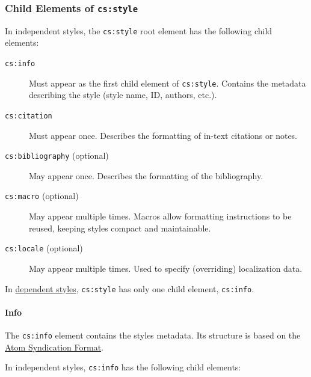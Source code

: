 \hypertarget{child-elements-of-csstyle}{%
\subsubsection{\texorpdfstring{Child Elements of
\texttt{cs:style}}{Child Elements of cs:style}}\label{child-elements-of-csstyle}}

In independent styles, the \texttt{cs:style} root element has the
following child elements:

\begin{description}
\item[\texttt{cs:info}]
Must appear as the first child element of \texttt{cs:style}. Contains
the metadata describing the style (style name, ID, authors, etc.).
\item[\texttt{cs:citation}]
Must appear once. Describes the formatting of in-text citations or
notes.
\item[\texttt{cs:bibliography} (optional)]
May appear once. Describes the formatting of the bibliography.
\item[\texttt{cs:macro} (optional)]
May appear multiple times. Macros allow formatting instructions to be
reused, keeping styles compact and maintainable.
\item[\texttt{cs:locale} (optional)]
May appear multiple times. Used to specify (overriding) localization
data.
\end{description}

In \protect\hyperlink{dependent-styles}{dependent styles},
\texttt{cs:style} has only one child element, \texttt{cs:info}.

\hypertarget{info}{%
\paragraph{Info}\label{info}}

The \texttt{cs:info} element contains the style\textquotesingle s
metadata. Its structure is based on the
\href{http://tools.ietf.org/html/rfc4287}{Atom Syndication Format}.

In independent styles, \texttt{cs:info} has the following child
elements:

